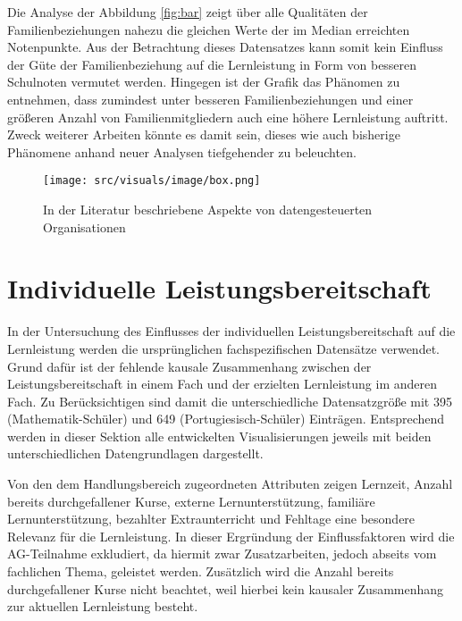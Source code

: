 Die Analyse der Abbildung \ref{fig:bar} zeigt über alle Qualitäten der Familienbeziehungen nahezu die gleichen Werte der im Median erreichten Notenpunkte.
Aus der Betrachtung dieses Datensatzes kann somit kein Einfluss der Güte der Familienbeziehung auf die Lernleistung in Form von besseren Schulnoten vermutet werden.
Hingegen ist der Grafik das Phänomen zu entnehmen, dass zumindest unter besseren Familienbeziehungen und einer größeren Anzahl von Familienmitgliedern auch eine höhere Lernleistung auftritt.
Zweck weiterer Arbeiten könnte es damit sein, dieses wie auch bisherige Phänomene anhand neuer Analysen tiefgehender zu beleuchten.

\begin{figure}[htb]
    \centering
    \texttt{[image: src/visuals/image/box.png]}
    \caption{In der Literatur beschriebene Aspekte von datengesteuerten Organisationen}
    \label{fig:box}
\end{figure}






\section{Individuelle Leistungsbereitschaft}

In der Untersuchung des Einflusses der individuellen Leistungsbereitschaft auf die Lernleistung werden die ursprünglichen fachspezifischen Datensätze verwendet.
Grund dafür ist der fehlende kausale Zusammenhang zwischen der Leistungsbereitschaft in einem Fach und der erzielten Lernleistung im anderen Fach.
Zu Berücksichtigen sind damit die unterschiedliche Datensatzgröße mit 395 (Mathematik-Schüler) und 649 (Portugiesisch-Schüler) Einträgen.
Entsprechend werden in dieser Sektion alle entwickelten Visualisierungen jeweils mit beiden unterschiedlichen Datengrundlagen dargestellt.

Von den dem Handlungsbereich zugeordneten Attributen zeigen Lernzeit, Anzahl bereits durchgefallener Kurse, externe Lernunterstützung, familiäre Lernunterstützung, bezahlter Extraunterricht und Fehltage eine besondere Relevanz für die Lernleistung. 
In dieser Ergründung der Einflussfaktoren wird die AG-Teilnahme exkludiert, da hiermit zwar Zusatzarbeiten, jedoch abseits vom fachlichen Thema, geleistet werden.
Zusätzlich wird die Anzahl bereits durchgefallener Kurse nicht beachtet, weil hierbei kein kausaler Zusammenhang zur aktuellen Lernleistung besteht.

